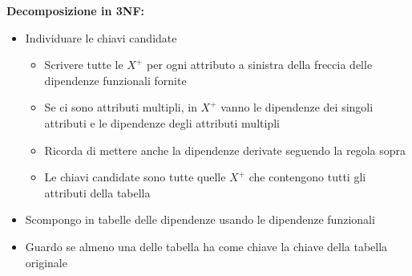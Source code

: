 \documentclass[10pt]{article}
\begin{document}
\textbf{Decomposizione in 3NF:}
\begin{itemize}
    \item Individuare le chiavi candidate \begin{itemize}
        \item Scrivere tutte le $X^{+}$ per ogni attributo a sinistra della freccia delle dipendenze funzionali fornite
        \item Se ci sono attributi multipli, in $X^{+}$ vanno le dipendenze dei singoli attributi e le dipendenze degli attributi multipli
        \item Ricorda di mettere anche la dipendenze derivate seguendo la regola sopra
        \item Le chiavi candidate sono tutte quelle $X^{+}$ che contengono tutti gli attributi della tabella
    \end{itemize}
    \item Scompongo in tabelle delle dipendenze usando le dipendenze funzionali
    \item Guardo se almeno una delle tabella ha come chiave la chiave della tabella originale
\end{itemize}
\end{document}
